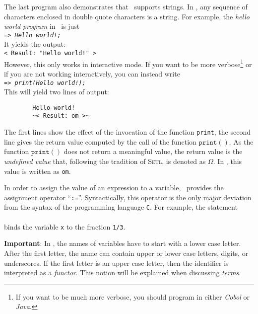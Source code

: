 \noindent
The last program also demonstrates that \setlx\ supports strings.  In \setlx, any sequence of
characters enclosed in double quote characters is a string.  For example, the 
\emph{hello world program} in \setlx\ is just 
\\[0.2cm]
\hspace*{1.3cm}
\texttt{=> \textsl{Hello world!;}}
\\[0.2cm]
It yields the output:
\\[0.2cm]
\hspace*{1.3cm}
\texttt{< Result: "Hello world!" >}
\texttt{}
\\[0.2cm]
However, this only works in interactive mode.  If you want to be more verbose\footnote{
If you want to be much more verbose, you should program in either \textsl{Cobol} or \textsl{Java}.
} or if you are not working interactively, you can instead write
\\[0.2cm]
\hspace*{1.3cm}
\texttt{=> \textsl{print(Hello world!);}}
\\[0.2cm]
This will yield two lines of  output:
\begin{verbatim}
        Hello world!
        ~< Result: om >~
\end{verbatim}
The first lines show the effect of the invocation of the function \texttt{print}, the
second line gives the return value computed by the call of the function $\texttt{print}()$.  As the
function $\texttt{print}()$ does not return a meaningful value, the
return value is the \emph{undefined value} that, following the
tradition of \textsc{Setl}, is denoted as $\Omega$.  In \setlx, this value is written as \texttt{om}.


In order to assign the value of an expression to a variable, \setlx\ provides the assignment
operator ``\texttt{:=}''.  Syntactically, this operator is the only major deviation from the syntax
of the programming language \texttt{C}.
For example, the statement
\\[0.2cm]
\hspace*{1.3cm}
\\[0.2cm]
binds the variable \texttt{x} to the fraction \texttt{1/3}.  
\vspace*{0.3cm}

\noindent
\textbf{Important}:  In \setlx, the names of variables
have to start with a lower case letter.  After the first letter, the name can contain
upper or lower case letters, digits, or underscores.  If the first letter is an upper case
letter, then the identifier is interpreted as a \emph{functor}.  This notion will be
explained when discussing \emph{terms}.


